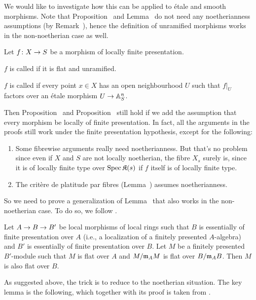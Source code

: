\documentclass[a4paper,parskip=half,numbers=enddot, DIV=12]{scrreprt}
\begin{document}
We would like to investigate how this can be applied to étale and smooth morphisms. Note that Proposition~ and Lemma~ do not need any noetherianness assumptions (by Remark~), hence the definition of unramified morphisms works in the non-noetherian case as well.
\begin{defi}
	Let $f\colon X\morphism S$ be a morphism of locally finite presentation.
	\begin{alphanumerate}
		\item $f$ is called  if it is flat and unramified.
		\item $f$ is called  if every point $x\in X$ has an open neighbourhood $U$ such that $f|_U$ factors over an étale morphism $U\morphism\IA_S^n$.
	\end{alphanumerate}
\end{defi}
Then Proposition~ and Proposition~ still hold if we add the assumption that every morphism be locally of finite presentation. In fact, all the arguments in the proofs still work under the finite presentation hypothesis, except for the following:
\begin{enumerate}
	\item Some fibrewise arguments really need noetherianness. But that's no problem since even if $X$ and $S$ are not locally noetherian, the fibre $X_s$ surely is, since it is of locally finite type over $\operatorname{Spec} \mathfrak{K}(s)$ if $f$ itself is of locally finite type.
	\item The critère de platitude par fibres (Lemma~) assumes noetherianness.
\end{enumerate}
So we need to prove a generalization of Lemma~ that also works in the non-noetherian case. To do so, we follow \cite[]{stacks-project}.
\begin{lem}
	Let $A\morphism B\morphism B'$ be local morphisms of local rings such that $B$ is essentially of finite presentation over $A$ (i.e., a localization of a finitely presented $A$-algebra) and $B'$ is essentially of finite presentation over $B$. Let $M$ be a finitely presented $B'$-module such that $M$ is flat over $A$ and $M/\mathfrak{m}_AM$ is flat over $B/\mathfrak{m}_AB$. Then $M$ is also flat over $B$.
\end{lem}
As suggested above, the trick is to reduce to the noetherian situation. The key lemma is the following, which together with its proof is taken from \cite[]{stacks-project}.
\end{document}
